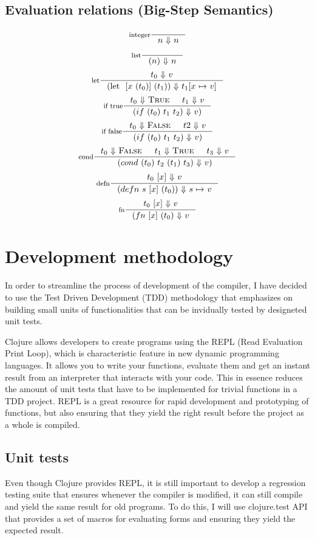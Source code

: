 \subsection{Evaluation relations (Big-Step Semantics)}

\[
\inference[integer]{}
{n \ $$\Downarrow$$ \ n}
\]
\[
\inference[list]{}
{(n) \ $$\Downarrow$$ \ n}
\]
\[
\inference[let]{t_0 \ $$\Downarrow$$ \ v}
{(\text{let } \ {[x \ (t_0)]} \ (t_1)) \ $$\Downarrow$$ \ t_1 {[}x \ $$\mapsto$$ \ v{]} }
\]
\[
\inference[if true]{{t_0} \ $$\Downarrow$$ \ \textsc{True} & t_1 \ $$\Downarrow$$ \ v}
{(if \ (t_0) \ t_1 \ t_2) \ $$\Downarrow$$ \ v) }
\]
\[
\inference[if false]{t_0 \ $$\Downarrow$$ \ \textsc{False} & t2 \ $$\Downarrow$$ \ v}
{(if \ (t_0) \ t_1 \ t_2) \ $$\Downarrow$$ \ v) }
\]
\[
\inference[cond]{t_0 \ $$\Downarrow$$ \ \textsc{False} & t_1 \ $$\Downarrow$$ \ \textsc{True} & t_3 \ $$\Downarrow$$ \ v}
{(cond \ (t_0) \ t_2 \ (t_1) \ t_3) \ $$\Downarrow$$ \ v) }
\]
\[
\inference[defn]{ {t_0 \ [x]} \ $$\Downarrow$$ \ v}
{(defn \ s \ {[x]} \ (t_0)) \ $$\Downarrow$$ \ s \ $$\mapsto$$ \ v }
\]
\[
\inference[fn]{ {t_0 \ [x]} \ $$\Downarrow$$ \ v}
{(fn \ {[x]}  \ (t_0) \ $$\Downarrow$$ \ v }
\]

\section{Development methodology}
In order to streamline the process of development of the compiler, I have decided to use the Test Driven Development (TDD) methodology that emphasizes on building small units of functionalities that can be invidually tested by designeted unit tests. 

Clojure allows developers to create programs using the REPL (Read Evaluation Print Loop), which is characteristic feature in new dynamic programming languages. It allows you to write your functions, evaluate them and get an instant result from an interpreter that interacts with your code. This in essence reduces the amount of unit tests that have to be implemented for trivial functions in a TDD project. 
REPL is a great resource for rapid development and prototyping of functions, but also ensuring that they yield the right result before the project as a whole is compiled.

\subsection{Unit tests}
Even though Clojure provides REPL, it is still important to develop a regression testing suite that ensures whenever the compiler is modified, it can still compile and yield the same result for old programs.
To do this, I will use clojure.test API that provides a set of macros for evaluating forms and ensuring they yield the expected result. 


